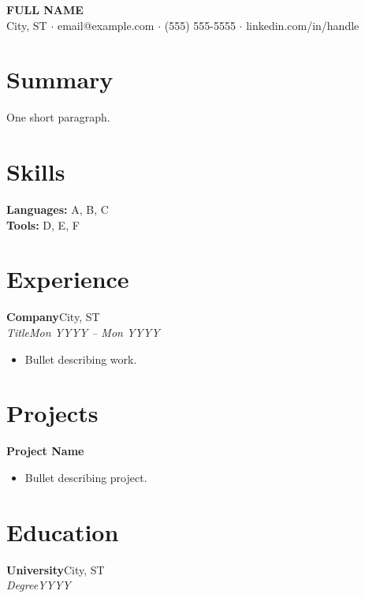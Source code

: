\documentclass[letterpaper,10pt]{article}
\newcommand{\entry}[4]{\noindent\textbf{#1}\hfill #2\\\textit{#3}\hfill\textit{#4}\vspace{1pt}}
\begin{document}
\begin{center}
  {\Large\textbf{FULL NAME}}\\[2pt]
  {\small City, ST $\cdot$ email@example.com $\cdot$ (555) 555-5555 $\cdot$ linkedin.com/in/handle}
\end{center}

\section{Summary}
One short paragraph.

\section{Skills}
\noindent\textbf{Languages:} A, B, C\\
\noindent\textbf{Tools:} D, E, F

\section{Experience}
\entry{Company}{City, ST}{Title}{Mon YYYY -- Mon YYYY}
\begin{itemize}
  \item Bullet describing work.
\end{itemize}

\section{Projects}
\noindent\textbf{Project Name}
\begin{itemize}
  \item Bullet describing project.
\end{itemize}

\section{Education}
\entry{University}{City, ST}{Degree}{YYYY}
\end{document}
